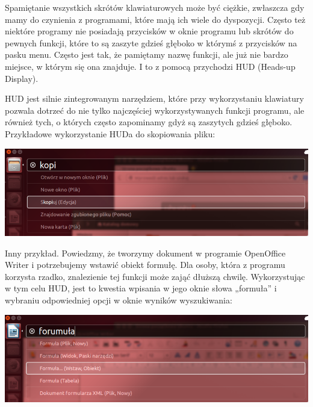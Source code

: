 Spamiętanie wszystkich skrótów klawiaturowych może być ciężkie, zwłaszcza gdy mamy do czynienia z programami, które mają ich wiele do dyspozycji. Często też niektóre programy nie posiadają przycisków w oknie programu lub skrótów do pewnych funkcji, które to są zaszyte gdzieś głęboko w którymś z przycisków na pasku menu. Często jest tak, że pamiętamy nazwę funkcji, ale już nie bardzo miejsce, w którym się ona znajduje. I to z pomocą przychodzi HUD (Heads-up Display).

HUD jest silnie zintegrowanym narzędziem, które przy wykorzystaniu klawiatury pozwala dotrzeć do nie tylko najczęściej wykorzystywanych funkcji programu, ale również tych, o których często zapominamy gdyż są zaszytych gdzieś głęboko. Przykładowe wykorzystanie HUDa do skopiowania pliku:
\begin{center}
	\includegraphics[scale=0.5]{images/unity_hud1.png}
\end{center}

Inny przykład. Powiedzmy, że tworzymy dokument w programie OpenOffice Writer i potrzebujemy wstawić obiekt formułę. Dla osoby, która z programu korzysta rzadko, znalezienie tej funkcji może zająć dłuższą chwilę. Wykorzystując w tym celu HUD, jest to kwestia wpisania w jego oknie słowa „formuła” i wybraniu odpowiedniej opcji w oknie wyników wyszukiwania:
\begin{center}
	\includegraphics[scale=0.5]{images/unity_hud2.png}
\end{center}
\clearpage